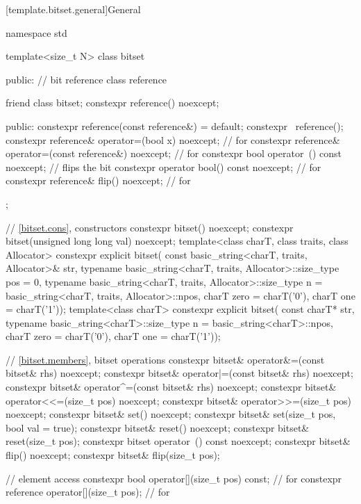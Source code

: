 [template.bitset.general]{General}%
%
\begin{codeblock}
namespace std {
  template<size_t N> class bitset {
  public:
    // bit reference
    class reference {
      friend class bitset;
      constexpr reference() noexcept;

    public:
      constexpr reference(const reference&) = default;
      constexpr ~reference();
      constexpr reference& operator=(bool x) noexcept;              // for 
      constexpr reference& operator=(const reference&) noexcept;    // for 
      constexpr bool operator~() const noexcept;                    // flips the bit
      constexpr operator bool() const noexcept;                     // for 
      constexpr reference& flip() noexcept;                         // for 
    };

    // \ref{bitset.cons}, constructors
    constexpr bitset() noexcept;
    constexpr bitset(unsigned long long val) noexcept;
    template<class charT, class traits, class Allocator>
      constexpr explicit bitset(
        const basic_string<charT, traits, Allocator>& str,
        typename basic_string<charT, traits, Allocator>::size_type pos = 0,
        typename basic_string<charT, traits, Allocator>::size_type n
          = basic_string<charT, traits, Allocator>::npos,
        charT zero = charT('0'),
        charT one = charT('1'));
    template<class charT>
      constexpr explicit bitset(
        const charT* str,
        typename basic_string<charT>::size_type n = basic_string<charT>::npos,
        charT zero = charT('0'),
        charT one = charT('1'));

    // \ref{bitset.members}, bitset operations
    constexpr bitset& operator&=(const bitset& rhs) noexcept;
    constexpr bitset& operator|=(const bitset& rhs) noexcept;
    constexpr bitset& operator^=(const bitset& rhs) noexcept;
    constexpr bitset& operator<<=(size_t pos) noexcept;
    constexpr bitset& operator>>=(size_t pos) noexcept;
    constexpr bitset& set() noexcept;
    constexpr bitset& set(size_t pos, bool val = true);
    constexpr bitset& reset() noexcept;
    constexpr bitset& reset(size_t pos);
    constexpr bitset  operator~() const noexcept;
    constexpr bitset& flip() noexcept;
    constexpr bitset& flip(size_t pos);

    // element access
    constexpr bool operator[](size_t pos) const;        // for 
    constexpr reference operator[](size_t pos);         // for 

}}
\end{codeblock}

